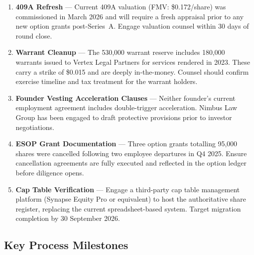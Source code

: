 \begin{enumerate}[leftmargin=1.8em, itemsep=4pt]
  \item \textbf{409A Refresh} --- Current 409A valuation (FMV: \$0.172/share) was commissioned
    in March 2026 and will require a fresh appraisal prior to any new option grants
    post-Series~A. Engage valuation counsel within 30 days of round close.

  \item \textbf{Warrant Cleanup} --- The 530,000 warrant reserve includes 180,000 warrants
    issued to Vertex Legal Partners for services rendered in 2023. These carry a strike of
    \$0.015 and are deeply in-the-money. Counsel should confirm exercise timeline and tax
    treatment for the warrant holders.

  \item \textbf{Founder Vesting Acceleration Clauses} --- Neither founder's current employment
    agreement includes double-trigger acceleration. Nimbus Law Group has been engaged to
    draft protective provisions prior to investor negotiations.

  \item \textbf{ESOP Grant Documentation} --- Three option grants totalling 95,000 shares were
    cancelled following two employee departures in Q4 2025. Ensure cancellation agreements
    are fully executed and reflected in the option ledger before diligence opens.

  \item \textbf{Cap Table Verification} --- Engage a third-party cap table management platform
    (Synapse Equity Pro or equivalent) to host the authoritative share register, replacing
    the current spreadsheet-based system. Target migration completion by 30 September 2026.
\end{enumerate}

\vspace{10pt}

\subsection{Key Process Milestones}


